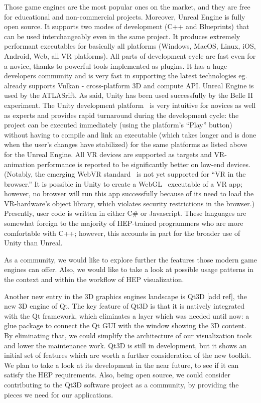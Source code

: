 \documentclass[12pt,a4paper]{article}
\begin{document}
Those game engines are the most popular ones on the market, and they are free for educational and non-commercial projects.
Moreover, Unreal Engine is fully open source. It supports two modes of development (C++ and Blueprints) that can be used
interchangeably even in the same project. It produces extremely performant executables for basically all platforms
(Windows, MacOS, Linux, iOS, Android, Web, all VR platforms). All parts of development cycle are fast even for a novice,
thanks to powerful tools implemented as plugins. It has a huge developers community and is very fast in supporting the
latest technologies eg. already supports Vulkan - cross-platform 3D and compute API. Unreal Engine is used by the ATLASrift.
As said, Unity has been used successfully by the Belle II experiment. The Unity development platform~\cite{Unity3D} is very
intuitive for novices as well as experts and provides rapid turnaround during the development cycle: the project can be
executed immediately (using the platform’s “Play” button) without having to compile and link an executable (which takes
longer and is done when the user’s changes have stabilized) for the same platforms as listed above for the Unreal Engine.
All VR devices are supported as targets and VR-animation performance is reported to be significantly better on low-end devices.
(Notably, the emerging WebVR standard~\cite{WebVR} is not yet supported for “VR in the browser.” It is possible in Unity to create a
WebGL~\cite{WebGL2011} executable of a VR app; however, no browser will run this app successfully because of its need to load the
VR-hardware’s object library, which violates security restrictions in the browser.) Presently, user code is written in either
C\# or Javascript. These languages are somewhat foreign to the majority of HEP-trained programmers who are more comfortable with
C++; however, this accounts in part for the broader use of Unity than Unreal.

As a community, we would like to explore further the features those modern game engines can offer. Also, we would like to take a
look at possible usage patterns in the context and within the workflow of HEP visualization.

Another new entry in the 3D graphics engines landscape is Qt3D [add ref],  the new 3D engine of Qt. The key feature of
Qt3D is that it is natively integrated with the Qt framework, which eliminates a layer which was needed until now: a glue
package to connect the Qt GUI with the window showing the 3D content. By eliminating that, we could simplify the architecture
of our visualization tools and lower the maintenance work. Qt3D is still in development, but it shows an initial set of
features which are worth a further consideration of the new toolkit. We plan to take a look at its development in the near future,
to see if it can satisfy the HEP requirements. Also, being open source, we could consider contributing to the Qt3D software
project as a community, by providing the pieces we need for our applications.
\end{document}
